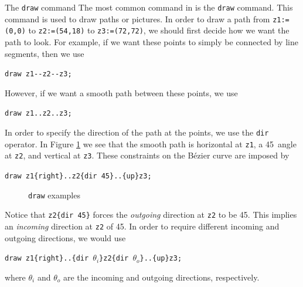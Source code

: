 \begin{subsection}{The \texttt{draw} command}
The most common command in \MP{} is the \texttt{draw} command.  This command is used to draw paths or pictures.  In order to draw a path from \texttt{z1:=(0,0)} to \texttt{z2:=(54,18)} to \texttt{z3:=(72,72)}, we should first decide how we want the path to look.  For example, if we want these points to simply be connected by line segments, then we use \begin{center}\verb|draw z1--z2--z3;|\end{center}  However, if we want a smooth path between these points, we use \begin{center}\verb|draw z1..z2..z3;|\end{center}  In order to specify the direction of the path at the points, we use the \texttt{dir} operator.  In Figure \ref{fig:draw1} we see that the smooth path is horizontal at \texttt{z1}, a 45\textdegree\ angle at \texttt{z2}, and vertical at \texttt{z3}.  These constraints on the B\'{e}zier curve are imposed by \begin{center}\verb|draw z1{right}..z2{dir 45}..{up}z3;|\end{center}
\begin{figure}[hptb]
	\begin{center}\end{center}
	\caption{\texttt{draw} examples}\label{fig:draw1}
\end{figure}
Notice that \verb|z2{dir 45}| forces the \textit{outgoing} direction at \texttt{z2} to be 45\textdegree.  This implies an \textit{incoming} direction at \texttt{z2} of 45\textdegree.  In order to require different incoming and outgoing directions, we would use \begin{center}\verb|draw z1{right}..{dir |$\theta_i$\verb|}z2{dir |$\theta_o$\verb|}..{up}z3;|\end{center} where $\theta_i$ and $\theta_o$ are the incoming and outgoing directions, respectively.
\end{subsection}

